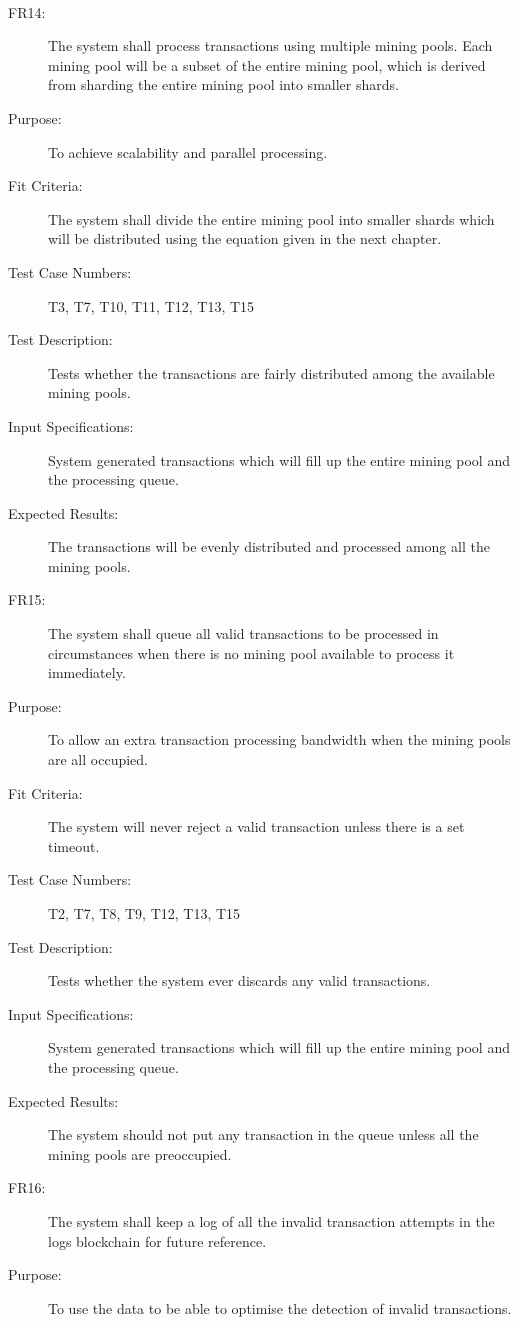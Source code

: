 \documentclass[a4paper,twoside,phd]{BYUPhys}
\begin{document}
\begin{description}
\\
\item[FR14:] The system shall process transactions using multiple mining pools. Each mining pool will be a subset of the entire mining pool, which is derived from sharding the entire mining pool into smaller shards.
\item[Purpose:] To achieve scalability and parallel processing.
\item[Fit Criteria:] The system shall divide the entire mining pool into smaller shards which will be distributed using the equation given in the next chapter.
\item[Test Case Numbers:] T3, T7, T10, T11, T12, T13, T15
\item[Test Description:] Tests whether the transactions are fairly distributed among the available mining pools.
\item[Input Specifications:] System generated transactions which will fill up the entire mining pool and the processing queue.
\item[Expected Results:] The transactions will be evenly distributed and processed among all the mining pools.
\\
\item[FR15:] The system shall queue all valid transactions to be processed in circumstances when there is no mining pool available to process it immediately.
\item[Purpose:] To allow an extra transaction processing bandwidth when the mining pools are all occupied.
\item[Fit Criteria:] The system will never reject a valid transaction unless there is a set timeout.
\item[Test Case Numbers:] T2, T7, T8, T9, T12, T13, T15
\item[Test Description:] Tests whether the system ever discards any valid transactions.
\item[Input Specifications:] System generated transactions which will fill up the entire mining pool and the processing queue.
\item[Expected Results:] The system should not put any transaction in the queue unless all the mining pools are preoccupied.
\\
\item[FR16:] The system shall keep a log of all the invalid transaction attempts in the logs blockchain for future reference.
\item[Purpose:] To use the data to be able to optimise the detection of invalid transactions.

\end{description}
\end{document}
